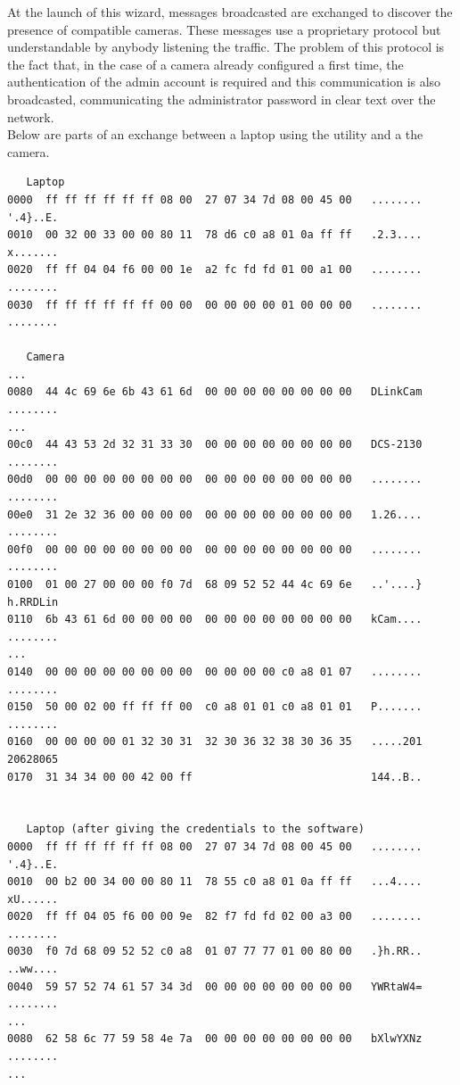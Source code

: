 At the launch of this wizard, messages broadcasted are exchanged to discover the presence of compatible cameras.
These messages use a proprietary protocol but understandable by anybody listening the traffic.
The problem of this protocol is the fact that, in the case of a camera already configured a first time, the authentication of the admin account is required and this communication is also broadcasted, communicating the administrator password in clear text over the network.\\

Below are parts of an exchange between a laptop using the utility and a the camera.

{\scriptsize
\begin{verbatim}
   Laptop
0000  ff ff ff ff ff ff 08 00  27 07 34 7d 08 00 45 00   ........ '.4}..E.
0010  00 32 00 33 00 00 80 11  78 d6 c0 a8 01 0a ff ff   .2.3.... x.......
0020  ff ff 04 04 f6 00 00 1e  a2 fc fd fd 01 00 a1 00   ........ ........
0030  ff ff ff ff ff ff 00 00  00 00 00 00 01 00 00 00   ........ ........

   Camera
...
0080  44 4c 69 6e 6b 43 61 6d  00 00 00 00 00 00 00 00   DLinkCam ........
...
00c0  44 43 53 2d 32 31 33 30  00 00 00 00 00 00 00 00   DCS-2130 ........
00d0  00 00 00 00 00 00 00 00  00 00 00 00 00 00 00 00   ........ ........
00e0  31 2e 32 36 00 00 00 00  00 00 00 00 00 00 00 00   1.26.... ........
00f0  00 00 00 00 00 00 00 00  00 00 00 00 00 00 00 00   ........ ........
0100  01 00 27 00 00 00 f0 7d  68 09 52 52 44 4c 69 6e   ..'....} h.RRDLin
0110  6b 43 61 6d 00 00 00 00  00 00 00 00 00 00 00 00   kCam.... ........
...
0140  00 00 00 00 00 00 00 00  00 00 00 00 c0 a8 01 07   ........ ........
0150  50 00 02 00 ff ff ff 00  c0 a8 01 01 c0 a8 01 01   P....... ........
0160  00 00 00 00 01 32 30 31  32 30 36 32 38 30 36 35   .....201 20628065
0170  31 34 34 00 00 42 00 ff                            144..B..         


   Laptop (after giving the credentials to the software)
0000  ff ff ff ff ff ff 08 00  27 07 34 7d 08 00 45 00   ........ '.4}..E.
0010  00 b2 00 34 00 00 80 11  78 55 c0 a8 01 0a ff ff   ...4.... xU......
0020  ff ff 04 05 f6 00 00 9e  82 f7 fd fd 02 00 a3 00   ........ ........
0030  f0 7d 68 09 52 52 c0 a8  01 07 77 77 01 00 80 00   .}h.RR.. ..ww....
0040  59 57 52 74 61 57 34 3d  00 00 00 00 00 00 00 00   YWRtaW4= ........
...
0080  62 58 6c 77 59 58 4e 7a  00 00 00 00 00 00 00 00   bXlwYXNz ........
...
\end{verbatim}
  }


